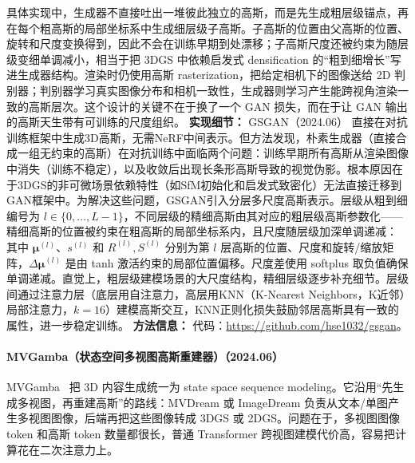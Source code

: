 具体实现中，生成器不直接吐出一堆彼此独立的高斯，而是先生成粗层级锚点，再在每个粗高斯的局部坐标系中生成细层级子高斯。子高斯的位置由父高斯的位置、旋转和尺度变换得到，因此不会在训练早期到处漂移；子高斯尺度还被约束为随层级变细单调减小，相当于把 3DGS 中依赖启发式 densification 的“粗到细增长”写进生成器结构。渲染时仍使用高斯 rasterization，把给定相机下的图像送给 2D 判别器；判别器学习真实图像分布和相机一致性，生成器则学习产生能跨视角渲染一致的高斯层次。这个设计的关键不在于换了一个 GAN 损失，而在于让 GAN 输出的高斯天生带有可训练的尺度组织。
\textbf{实现细节：} GSGAN（2024.06） 直接在对抗训练框架中生成3D高斯，无需NeRF中间表示。但方法发现，朴素生成器（直接合成一组无约束的高斯）在对抗训练中面临两个问题：训练早期所有高斯从渲染图像中消失（训练不稳定），以及收敛后出现长条形高斯导致的视觉伪影。根本原因在于3DGS的非可微场景依赖特性（如SfM初始化和启发式致密化）无法直接迁移到GAN框架中。为解决这些问题，GSGAN引入分层多尺度高斯表示。层级从粗到细编号为 $l \in \{0, \ldots, L-1\}$，不同层级的精细高斯由其对应的粗层级高斯参数化——精细高斯的位置被约束在粗高斯的局部坐标系内，且尺度随层级加深单调递减： 其中 $\boldsymbol{\mu}^{(l)}$、$s^{(l)}$ 和 $R^{(l)}, S^{(l)}$ 分别为第 $l$ 层高斯的位置、尺度和旋转/缩放矩阵，$\Delta\boldsymbol{\mu}^{(l)}$ 是由 tanh 激活约束的局部位置偏移。尺度差使用 softplus 取负值确保单调递减。直觉上，粗层级建模场景的大尺度结构，精细层级逐步补充细节。层级间通过注意力层（底层用自注意力，高层用KNN（K-Nearest Neighbors，K近邻）局部注意力，$k=16$）建模高斯交互，KNN正则化损失鼓励邻居高斯具有一致的属性，进一步稳定训练。
\textbf{方法信息：} 代码：\url{https://github.com/hse1032/gsgan}。



\paragraph{MVGamba（状态空间多视图高斯重建器）（2024.06）}
MVGamba~\cite{2406_06367} 把 3D 内容生成统一为 state space sequence modeling。它沿用“先生成多视图，再重建高斯”的路线：MVDream 或 ImageDream 负责从文本/单图产生多视图图像，后端再把这些图像转成 3DGS 或 2DGS。问题在于，多视图图像 token 和高斯 token 数量都很长，普通 Transformer 跨视图建模代价高，容易把计算花在二次注意力上。

